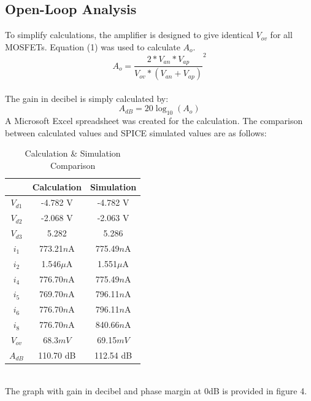\documentclass[conference,compsoc]{IEEEtran}
\begin{document}
\subsection{Open-Loop Analysis}

To simplify calculations, the amplifier is designed to give identical \(V_{ov}\) for all MOSFETs. Equation (1) was used to calculate \(A_o\).
\begin{equation}
A_o = \frac{2*V_{an} * V_{ap}}{V_{ov}*(V_{an}+V_{ap})}^2
\end{equation}\\
The gain in decibel is simply calculated by:
\[
A_{dB} = 20 \log_{10}(A_o)
\]
A Microsoft Excel spreadsheet was created for the calculation. The comparison between calculated values and SPICE simulated values are as follows:\\
\begin{table}[!htb]
	\begin{center}
	\begin{tabular}{|c|c|c|}
	\hline
	&Calculation & Simulation\\
	\hline	
	\(V_{d1}\) & -4.782 V&-4.782 V\\
	\(V_{d2}\) & -2.068 V&-2.063 V\\
	\(V_{d3}\) & 5.282&5.286\\
	\(i_1\)&773.21\(n\)A&775.49\(n\)A\\
	\(i_2\)&1.546\(\mu\)A&1.551\(\mu\)A\\
	\(i_4\)&776.70\(n\)A&775.49\(n\)A\\
	\(i_5\)&769.70\(n\)A&796.11\(n\)A\\
	\(i_6\)&776.70\(n\)A&796.11\(n\)A\\
	\(i_8\)&776.70\(n\)A&840.66\(n\)A\\
	\(V_{ov}\)&68.3\(mV\)&69.15\(mV\)\\
	\(A_{dB}\)&110.70 dB &112.54 dB\\
	\hline
	\end{tabular}
	\end{center}
	\caption{Calculation \& Simulation Comparison}\label{table2 :}
\end{table}\\
The graph with gain in decibel and phase margin at 0dB is provided in figure 4.\\
\end{document}
